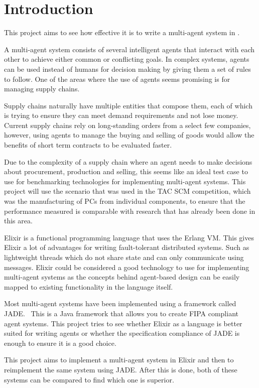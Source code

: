 \section{Introduction}

This project aims to see how effective it is to write a multi-agent system in .

A multi-agent system consists of several intelligent agents that interact with each other to achieve either common or conflicting goals.
In complex systems, agents can be used instead of humans for decision making by giving them a set of rules to follow.
One of the areas where the use of agents seems promising is for managing supply chains.

Supply chains naturally have multiple entities that compose them, each of which is trying to ensure they can meet demand requirements and not lose money.
Current supply chains rely on long-standing orders from a select few companies, however, using agents to manage the buying and selling of goods would allow the benefits of short term contracts to be evaluated faster.

Due to the complexity of a supply chain where an agent needs to make decisions about procurement, production and selling, this seems like an ideal test case to use for benchmarking technologies for implementing multi-agent systems.
This project will use the scenario that was used in the TAC SCM competition, which was the manufacturing of PCs from individual components, to ensure that the performance measured is comparable with research that has already been done in this area.

Elixir is a functional programming language that uses the Erlang VM\@.
This gives Elixir a lot of advantages for writing fault-tolerant distributed systems.
Such as lightweight threads which do not share state and can only communicate using messages.
Elixir could be considered a good technology to use for implementing multi-agent systems as the concepts behind agent-based design can be easily mapped to existing functionality in the language itself.

Most multi-agent systems have been implemented using a framework called JADE\@.~\cite{bellifemine1999jade}
This is a Java framework that allows you to create FIPA compliant agent systems.
This project tries to see whether Elixir as a language is better suited for writing agents or whether the specification compliance of JADE is enough to ensure it is a good choice.

This project aims to implement a multi-agent system in Elixir and then to reimplement the same system using JADE\@.
After this is done, both of these systems can be compared to find which one is superior.

